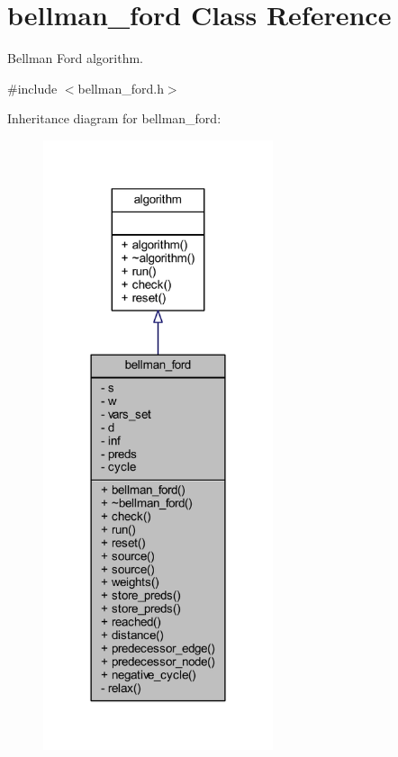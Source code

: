 \hypertarget{classbellman__ford}{}\section{bellman\+\_\+ford Class Reference}
\label{classbellman__ford}


Bellman Ford algorithm.  




{\ttfamily \#include $<$bellman\+\_\+ford.\+h$>$}



Inheritance diagram for bellman\+\_\+ford\+:\nopagebreak
\begin{figure}[H]
\begin{center}
\leavevmode
\includegraphics[width=191pt]{classbellman__ford__inherit__graph}
\end{center}
\end{figure}


